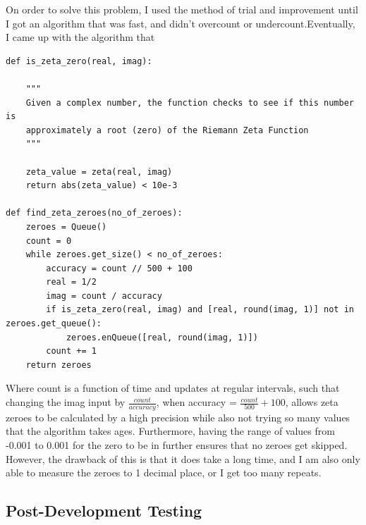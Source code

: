 \documentclass{article}
\begin{document}
On order to solve this problem, I used the method of trial and improvement until I got an algorithm that was fast, and didn't overcount or undercount.Eventually, I came up with the algorithm that

\begin{lstlisting}
def is_zeta_zero(real, imag):

    """
    Given a complex number, the function checks to see if this number is
    approximately a root (zero) of the Riemann Zeta Function
    """

    zeta_value = zeta(real, imag)
    return abs(zeta_value) < 10e-3

def find_zeta_zeroes(no_of_zeroes):
    zeroes = Queue()
    count = 0
    while zeroes.get_size() < no_of_zeroes:
        accuracy = count // 500 + 100
        real = 1/2
        imag = count / accuracy
        if is_zeta_zero(real, imag) and [real, round(imag, 1)] not in zeroes.get_queue():
            zeroes.enQueue([real, round(imag, 1)])
        count += 1
    return zeroes
\end{lstlisting}

Where count is a function of time and updates at regular intervals, such that changing the imag input by $\frac{count}{accuracy}$, when accuracy = $\frac{count}{500} + 100$, allows zeta zeroes to be calculated by a high precision while also not trying so many values that the algorithm takes ages. Furthermore, having the range of values from -0.001 to 0.001 for the zero to be in further ensures that no zeroes get skipped. However, the drawback of this is that it does take a long time, and I am also only able to measure the zeroes to 1 decimal place, or I get too many repeats.

\clearpage



\subsection{Post-Development Testing}
\end{document}
